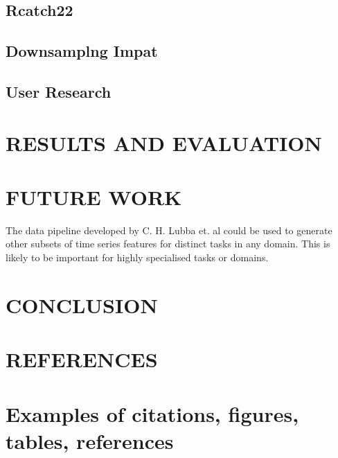 \documentclass{article}
\begin{document}
\hypertarget{rcatch22}{%
\subsection{Rcatch22}\label{rcatch22}}

\hypertarget{downsamplng-impat}{%
\subsection{Downsamplng Impat}\label{downsamplng-impat}}

\hypertarget{user-research}{%
\subsection{User Research}\label{user-research}}

\hypertarget{results-and-evaluation}{%
\section{RESULTS AND EVALUATION}\label{results-and-evaluation}}

\label{sec:headings}

\hypertarget{future-work}{%
\section{FUTURE WORK}\label{future-work}}

\label{sec:headings}

The data pipeline developed by C. H. Lubba et. al could be used to
generate other subsets of time series features for distinct tasks in any
domain. This is likely to be important for highly specialised tasks or
domains.

\hypertarget{conclusion}{%
\section{CONCLUSION}\label{conclusion}}

\label{sec:headings}

\hypertarget{references}{%
\section{REFERENCES}\label{references}}

\label{sec:headings}

\hypertarget{examples-of-citations-figures-tables-references}{%
\section{Examples of citations, figures, tables,
references}\label{examples-of-citations-figures-tables-references}}
\end{document}
